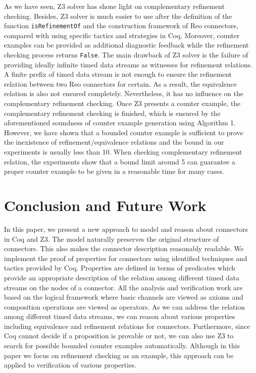 \documentclass[preprint,3p]{elsarticle}
\newcommand{\xy}[1]{{#1}}
\begin{document}
As we have seen, Z3 solver has shone light on complementary refinement checking. Besides, Z3 solver is much easier to use after the definition of the function \texttt{isRefinementOf} and the construction framework of Reo connectors, compared with using specific tactics and strategies in Coq. Moreover, counter examples can be provided \xy{as additional diagnostic feedback} while the refinement checking process returns \texttt{False}.
\xy{The main drawback of Z3 solver is the failure of providing ideally infinite timed data streams as witnesses for refinement relations.} A finite prefix of timed data stream is not enough to ensure the refinement relation between two Reo connectors for certain. As a result, the equivalence relation is also not ensured completely. Nevertheless, \xy{it has no influence on the complementary refinement checking. Once Z3 presents a counter example, the complementary refinement checking is finished, which is ensured by the aforementioned soundness of counter example generation using Algorithm 1.}
\xy{However, we have shown that a bounded counter example is sufficient to prove the inexistence of refinement/equivalence relations and the bound in our experiments is usually less than 10. When checking complementary refinement relation, the experiments show that a bound limit around 5 can guarantee a proper counter example to be given in a reasonable time for many cases.}

\section{Conclusion and Future Work}\label{sec:conclusion}
In this paper, we present a new approach to model and reason about connectors in Coq and Z3. The model naturally
preserves the original structure of connectors. This also makes the connector description reasonably readable. We
implement the proof of properties for connectors using identified techniques and tactics provided by Coq. Properties are
defined in terms of predicates which provide an appropriate description of the relation among different
timed data streams on the nodes of a connector. All the analysis and verification work are based on the logical framework
where basic channels are viewed as axioms and composition operations are viewed as operators. As we can address
the relation among different timed data streams, we can reason about various properties including equivalence and refinement relations for connectors. Furthermore, since Coq cannot decide if a proposition is provable or not, we can also use Z3 to search for possible bounded counter examples automatically. Although in this paper we focus on refinement checking as an example, this approach can be applied to verification of various properties.
\end{document}
